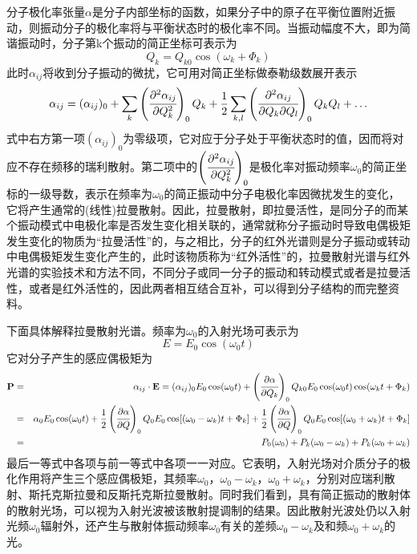 \documentclass[a4paper]{article}
\begin{document}
分子极化率张量\textbf{$\alpha$}是分子内部坐标的函数，如果分子中的原子在平衡位置附近振动，则振动分子的极化率将与平衡状态时的极化率不同。当振动幅度不大，即为简谐振动时，分子第k个振动的简正坐标可表示为
\begin{equation}
Q_k = Q_{k0}\cos(\omega_k+\Phi_k)\label{eq3}
\end{equation}
此时$\alpha_{ij}$将收到分子振动的微扰，它可用对简正坐标做泰勒级数展开表示
\begin{equation}
\alpha_{ij} = (\alpha_{ij})_0 + \sum\limits_{k}\left(\cfrac{\partial^2\alpha_{ij}}{\partial Q_k^2}\right)_0Q_k + \frac12\sum\limits_{k,l}\left(\cfrac{\partial^2\alpha_{ij}}{\partial Q_k\partial Q_l}\right)_0Q_kQ_l + \dots\label{eq4}
\end{equation}
式中右方第一项$(\alpha_{ij})_0$为零级项，它对应于分子处于平衡状态时的值，因而将对应不存在频移的瑞利散射。第二项中的$\left(\cfrac{\partial^2\alpha_{ij}}{\partial Q_k^2}\right)_0$是极化率对振动频率$\omega_0$的简正坐标的一级导数，表示在频率为$\omega_0$的简正振动中分子电极化率因微扰发生的变化，它将产生通常的(线性)拉曼散射。因此，拉曼散射，即拉曼活性，是同分子的而某个振动模式中电极化率是否发生变化相关联的，通常就称分子振动时导致电偶极矩发生变化的物质为“拉曼活性”的，与之相比，分子的红外光谱则是分子振动或转动中电偶极矩发生变化产生的，此时该物质称为“红外活性”的，拉曼散射光谱与红外光谱的实验技术和方法不同，不同分子或同一分子的振动和转动模式或者是拉曼活性，或者是红外活性的，因此两者相互结合互补，可以得到分子结构的而完整资料。

下面具体解释拉曼散射光谱。频率为$\omega_0$的入射光场可表示为
\begin{equation}
E = E_0\cos(\omega_0t)\label{eq5}
\end{equation}
它对分子产生的感应偶极矩为
\begin{eqnarray}
\textbf{P} 
&=& \alpha_{ij}\cdot\textbf{E} = (\alpha_{ij})_0E_0\cos(\omega_0t) + \left(\cfrac{\partial \alpha}{\partial Q_k}\right)_0Q_{k0}E_0\cos(\omega_0t)\cos(\omega_kt+\Phi_k)\nonumber\\
&=& \alpha_0E_0\cos(\omega_0t) + \frac12\left(\cfrac{\partial \alpha}{\partial Q}\right)_0Q_0E_0\cos[(\omega_0 - \omega_k)t+\Phi_k] + \frac12\left(\cfrac{\partial \alpha}{\partial Q}\right)_0Q_0E_0\cos[(\omega_0+\omega_k)t+\Phi_k]\nonumber\\
&=& P_0(\omega_0) + P_k(\omega_0 - \omega_k) + P_k(\omega_0 + \omega_k)
\end{eqnarray}
最后一等式中各项与前一等式中各项一一对应。它表明，入射光场对介质分子的极化作用将产生三个感应偶极矩，其频率$\omega_0$，$\omega_0 - \omega_k$，$\omega_0+\omega_k$，分别对应瑞利散射、斯托克斯拉曼和反斯托克斯拉曼散射。同时我们看到，具有简正振动的散射体的散射光场，可以视为入射光波被该散射提调制的结果。因此散射光波处仍以入射光频$\omega_0$辐射外，还产生与散射体振动频率$\omega_0$有关的差频$\omega_0 - \omega_k$及和频$\omega_0+\omega_k$的光。
\end{document}
